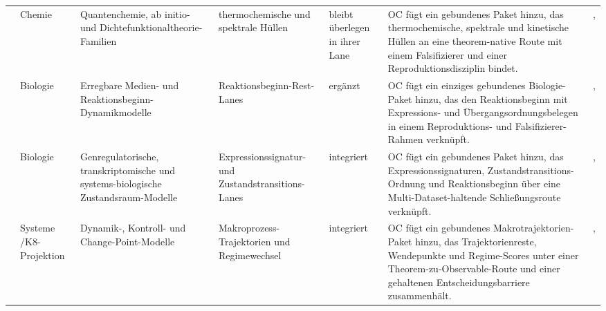 \begin{longtable}{@{}L{0.14\textwidth}L{0.09\textwidth}L{0.14\textwidth}L{0.12\textwidth}L{0.10\textwidth}L{0.18\textwidth}L{0.15\textwidth}@{}}
 & Chemie & Quantenchemie, ab initio- und Dichtefunktionaltheorie-Familien & thermochemische und spektrale Hüllen & bleibt überlegen in ihrer Lane & OC fügt ein gebundenes Paket hinzu, das thermochemische, spektrale und kinetische Hüllen an eine theorem-native Route mit einem Falsifizierer und einer Reproduktionsdisziplin bindet. & , \allowbreak {} \\
 & Biologie & Erregbare Medien- und Reaktionsbeginn-Dynamikmodelle & Reaktionsbeginn-Rest-Lanes & ergänzt & OC fügt ein einziges gebundenes Biologie-Paket hinzu, das den Reaktionsbeginn mit Expressions- und Übergangsordnungsbelegen in einem Reproduktions- und Falsifizierer-Rahmen verknüpft. & , \allowbreak {} \\
 & Biologie & Genregulatorische, transkriptomische und systems-biologische Zustandsraum-Modelle & Expressionssignatur- und Zustandstransitions-Lanes & integriert & OC fügt ein gebundenes Paket hinzu, das Expressionssignaturen, Zustandstransitions-Ordnung und Reaktionsbeginn über eine Multi-Dataset-haltende Schließungsroute verknüpft. & , \allowbreak {} \\
 & Systeme /\allowbreak K8-Projektion & Dynamik-, Kontroll- und Change-Point-Modelle & Makroprozess-Trajektorien und Regimewechsel & integriert & OC fügt ein gebundenes Makrotrajektorien-Paket hinzu, das Trajektorienreste, Wendepunkte und Regime-Scores unter einer Theorem-zu-Observable-Route und einer gehaltenen Entscheidungsbarriere zusammenhält. & , \allowbreak {} \\

\end{longtable}

